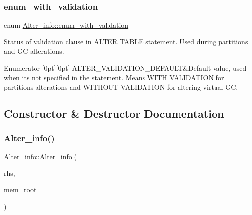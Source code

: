 \subsubsection{\texorpdfstring{enum\+\_\+with\+\_\+validation}{enum\_with\_validation}}
{\footnotesize\ttfamily enum \mbox{\hyperlink{classAlter__info_a4779e4302f27cfae682bf2e5a2e891a5}{Alter\+\_\+info\+::enum\+\_\+with\+\_\+validation}}}

Status of validation clause in A\+L\+T\+ER \mbox{\hyperlink{structTABLE}{T\+A\+B\+LE}} statement. Used during partitions and GC alterations. \begin{DoxyEnumFields}{Enumerator}
[0pt][0pt]{}\mbox{\label{classAlter__info_a4779e4302f27cfae682bf2e5a2e891a5a22b20f085e866c35f95a13f599ece203}} 
A\+L\+T\+E\+R\+\_\+\+V\+A\+L\+I\+D\+A\+T\+I\+O\+N\+\_\+\+D\+E\+F\+A\+U\+LT&Default value, used when it\textquotesingle{}s not specified in the statement. Means W\+I\+TH V\+A\+L\+I\+D\+A\+T\+I\+ON for partitions alterations and W\+I\+T\+H\+O\+UT V\+A\+L\+I\+D\+A\+T\+I\+ON for altering virtual GC. \\
\hline

\end{DoxyEnumFields}


\subsection{Constructor \& Destructor Documentation}
\mbox{\label{classAlter__info_a29143ad6c3785957b694487bcb37dccc}} 
\subsubsection{\texorpdfstring{Alter\+\_\+info()}{Alter\_info()}}
{\footnotesize\ttfamily Alter\+\_\+info\+::\+Alter\+\_\+info (\begin{DoxyParamCaption}\item[{const \mbox{\hyperlink{classAlter__info}{Alter\+\_\+info}} \&}]{rhs,  }\item[{M\+E\+M\+\_\+\+R\+O\+OT $\ast$}]{mem\+\_\+root }\end{DoxyParamCaption})}

